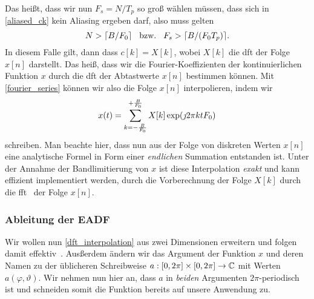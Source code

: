 Das hei{\ss}t, dass wir nun $F_s = N/T_p$ so gro{\ss} w\"ahlen m\"ussen, dass sich in \eqref{aliased_ck} kein Aliasing ergeben darf, also muss gelten
\begin{equation}
    N > \lceil B/F_0 \rceil {\hspace{3mm} \text{bzw.} \hspace{3mm}} F_s > \lceil B/(F_0 T_p) \rceil.
\end{equation}
In diesem Falle gilt, dann dass $c[k] = X[k]$, wobei $X[k]$ die \gls{dft} der Folge $x[n]$ darstellt. Das hei{\ss}, dass wir die Fourier-Koeffizienten der kontinuierlichen Funktion $x$ durch die \gls{dft} der Abtastwerte $x[n]$ bestimmen k\"onnen. Mit \eqref{fourier_series} k\"onnen wir also die Folge $x[n]$ interpolieren, indem wir
\begin{equation}\label{dft_interpolation}
    x(t) = {\sum\limits_{k=-\frac{B}{F_0}}^{+\frac{B}{F_0}}{
        X[k] \exp(\jmath 2 \pi k t F_0) 
    }}
\end{equation}
schreiben. Man beachte hier, dass nun aus der Folge von diskreten Werten $x[n]$ eine analytische Formel in Form einer \emph{endlichen} Summation entstanden ist. Unter der Annahme der Bandlimitierung von $x$ ist diese Interpolation \emph{exakt} und kann effizient implementiert werden, durch die Vorberechnung der Folge $X[k]$ durch die \gls{fft}~\cite{FFTW05} der Folge $x[n]$. 
%
%
%
%
\subsubsection{Ableitung der EADF}
%
%
Wir wollen nun \eqref{dft_interpolation} aus zwei Dimensionen erweitern und folgen damit effektiv~\cite{landmann2004EADF}.
Aus{\ss}erdem \"andern wir das Argument der Funktion $x$ und deren Namen zu der \"ublicheren Schreibweise $a : [0, 2 \pi] \times [0, 2 \pi] \rightarrow \mathbb{C}$ mit Werten $a(\varphi, \vartheta)$. 
Wir nehmen nun hier an, dass $a$ in \emph{beiden} Argumenten $2\pi$-periodisch ist und schneiden somit die Funktion bereits auf unsere Anwendung zu.

